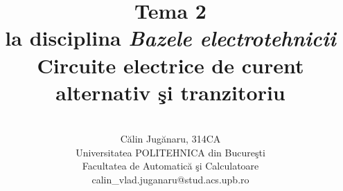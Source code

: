 \documentclass[a4paper]{article}
\title{\Huge \bfseries Tema 2 \\[1.5cm]  \Large la disciplina \textit{Bazele electrotehnicii} \\[10cm]} \par
\author{\\[1cm] \Large C\u alin Jug\u anaru, 314CA 
	\\[1.8cm] Universitatea POLITEHNICA din Bucure\c sti 
	\\[0.4cm] Facultatea de Automatic\u a \c si Calculatoare
	\\[2cm] calin\_vlad.juganaru@stud.acs.upb.ro \\}
\begin{document}
\maketitle
\pagebreak
\renewcommand{\contentsname}{ \huge \bfseries Cuprins}
\renewcommand{\refname}{Bibliografie}

\tableofcontents
\newpage


\title{\huge \center Circuite electrice de curent alternativ \c si tranzitoriu} \\
\maketitle
\end{document}
